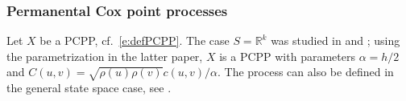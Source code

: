 \documentclass[alpha-refs]{wiley-article}
\begin{document}
 

%
%
%
%

\subsubsection{Permanental Cox point processes}

Let $X$ be a PCPP, %
cf.\ \eqref{e:defPCPP}. The case $S=\mathbb R^k$ was studied in \citet{Macchi:75} and \citet{MacCM}; using the parametrization in the latter paper, $X$ is a PCPP with parameters $\alpha=h/2$ and $C(u,v)=\sqrt{\rho(u)\rho(v)}c(u,v)/\alpha$. 
The process can also be defined in the general state space case, see \citet{ShiraiTakahashi}.
\end{document}
